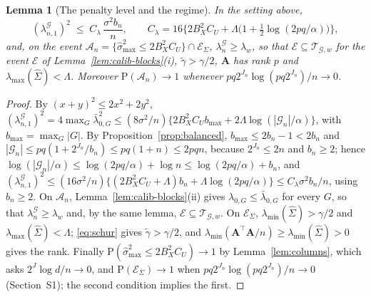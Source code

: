 \documentclass[10pt]{book}
\newtheorem{lemma}{Lemma}[section]
\theoremstyle{definition}
\newcommand{\Prob}{\mathrm{P}}
\newcommand{\T}{^{\top}}
\newcommand{\Gramhat}{\widehat{\Sigma}}
\newcommand{\pen}{\lambda}
\newcommand{\Amat}{\mathbf{A}}
\newcommand{\smax}{\widehat{\sigma}_{\max}}
\newcommand{\gtil}{\widetilde{\gamma}}
\newcommand{\lmin}{\lambda_{\min}}
\newcommand{\lmaxx}{\lambda_{\max}}
\newcommand{\Gcal}{\mathcal{G}}
\newcommand{\bn}{b_{n}}
\newcommand{\lamG}{\lambda^{\mathcal{G}}_{n}}
\newcommand{\lamGone}{\lambda^{\mathcal{G}}_{n,1}}
\newcommand{\lamz}[1]{\lambda_{0,#1}}
\newcommand{\lamzbar}[1]{\bar{\lambda}_{0,#1}}
\newcommand{\Tw}{\mathcal{T}_{\mathcal{G},w}}
\newcommand{\Ecal}{\mathcal{E}}
\newcommand{\ESig}{\mathcal{E}_{\Sigma}}
\newcommand{\Acal}{\mathcal{A}_{n}}
\begin{document}
{\color{colR1}
\begin{lemma}[The penalty level and the regime]
\label{lem:regime}
In the setting above,
\begin{equation}
  \label{eq:order-lambda}
  (\lamGone)^{2} \;\le\; C_{\pen}\,\frac{\sigma^{2}\bn}{n},
  \qquad
  C_{\pen} = 16\bigl\{2B_X^{2}C_U + \Lambda\bigl(1 + \tfrac12\log(2pq/\alpha)\bigr)\bigr\},
\end{equation}
and, on the event $\Acal = \{\smax^{2} \le 2B_X^{2}C_U\}\cap\ESig$,
$\lamG \ge \pen_{w}$, so that $\Ecal \subseteq \Tw$ for the event $\Ecal$ of
Lemma~\ref{lem:calib-blocks}(i), $\gtil > \gamma/2$, $\Amat$ has rank $p$ and
$\lmaxx(\Gramhat) < \Lambda$. Moreover $\Prob(\Acal) \to 1$ whenever
$pq2^{J_n}\log(pq2^{J_n})/n \to 0$.
\end{lemma}

\begin{proof}
By $(x+y)^{2} \le 2x^{2}+2y^{2}$, $(\lamGone)^{2} = 4\max_{G}\lamzbar{G}^{2} \le
(8\sigma^{2}/n)\{2B_X^{2}C_U b_{\max} + 2\Lambda\log(|\Gcal_{n}|/\alpha)\}$, with
$b_{\max} = \max_{G}|G|$. By Proposition~\ref{prop:balanced},
$b_{\max} \le 2\bn - 1 < 2\bn$ and $|\Gcal_{n}| \le pq(1 + 2^{J_n}/\bn) \le
pq(1+n) \le 2pqn$, because $2^{J_n} \le 2n$ and $\bn \ge 2$; hence
$\log(|\Gcal_{n}|/\alpha) \le \log(2pq/\alpha) + \log n \le \log(2pq/\alpha) +
\bn$, and $(\lamGone)^{2} \le (16\sigma^{2}/n)\{(2B_X^{2}C_U + \Lambda)\bn +
\Lambda\log(2pq/\alpha)\} \le C_{\pen}\sigma^{2}\bn/n$, using $\bn \ge 2$. On
$\Acal$, Lemma~\ref{lem:calib-blocks}(ii) gives $\lamz{G} \le \lamzbar{G}$ for
every $G$, so that $\lamG \ge \pen_{w}$ and, by the same lemma,
$\Ecal \subseteq \Tw$. On $\ESig$, $\lmin(\Gramhat) > \gamma/2$ and
$\lmaxx(\Gramhat) < \Lambda$; \eqref{eq:schur} gives $\gtil > \gamma/2$, and
$\lmin(\Amat\T\Amat/n) \ge \lmin(\Gramhat) > 0$ gives the rank. Finally
$\Prob(\smax^{2} \le 2B_X^{2}C_U) \to 1$ by Lemma~\ref{lem:columns}, which asks
$2^{J}\log d/n \to 0$, and $\Prob(\ESig) \to 1$ when
$pq2^{J_n}\log(pq2^{J_n})/n \to 0$ (Section~S1); the second condition implies
the first.
\end{proof}
}
\end{document}

